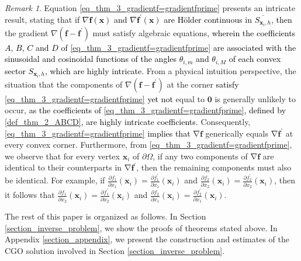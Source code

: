 \documentclass[11pt,reqno,oneside]{amsart}
\theoremstyle{definition}
\theoremstyle{remark}
\newtheorem{remark}{Remark}[section]
\numberwithin{equation}{section}
\numberwithin{equation}{section}
\theoremstyle{remark}
\DeclareMathOperator{\grad}{\nabla}
\begin{document}
\begin{remark}
	Equation \eqref{eq_thm_3_gradientf=gradientfprime} presents an intricate result, stating that \textcolor{black}{if $\nabla \mathbf{f}\left(\mathbf{x}\right)$ and $\nabla \mathbf{f}^{\prime}\left(\mathbf{x}\right)$ are H\"older continuous in $\overline{S_{\mathbf x_{i},h}}$, then} the gradient  $ \nabla \left(\mathbf{f}-\mathbf{f}^{\prime}\right) $ must satisfy algebraic equations, \textcolor{black}{wherein the coefficients $A$, $B$, $C$ and $D$ of  \eqref{eq_thm_3_gradientf=gradientfprime}  are associated with the sinusoidal and cosinoidal functions of the angles $\theta_{i,m}$ and $\theta_{i,M}$ of each convex sector $  S_{\mathbf{x}_{i},h}  $, which are  highly intricate.} From a physical intuition perspective, the situation that the components of $ \nabla \left(\mathbf{f}-\mathbf{f}^{\prime}\right) $ at the corner \textcolor{black}{satisfy \eqref{eq_thm_3_gradientf=gradientfprime} yet not} equal to $\mathbf{0}$ is generally unlikely to occur, \textcolor{black}{as the coefficients of \eqref{eq_thm_3_gradientf=gradientfprime}, defined  by \eqref{def_thm_2_ABCD}, are highly intricate coefficients.} Consequently, \textcolor{black}{\eqref{eq_thm_3_gradientf=gradientfprime} implies that} $ \grad\mathbf{f} $ generically  equals $ \grad\mathbf{f}^{\prime} $ at every convex corner. Furthermore, from \eqref{eq_thm_3_gradientf=gradientfprime}, we observe that for every vertex $ \mathbf{x}_{i} $ of $ \partial \Omega $, if any two components of  $ \grad\mathbf{f}$ are identical to their counterparts  in  $ \grad\mathbf{f}^{\prime}  $, then the remaining components must also be identical. For example, if $ \frac{\partial f_1}{\partial x_1}(\mathbf{x}_{i}) = \frac{\partial f^{\prime}_1}{\partial x_1}(\mathbf{x}_{i}) $ and $ \frac{\partial f_2}{\partial x_2}(\mathbf{x}_{i}) = \frac{\partial f^{\prime}_2}{\partial x_2}(\mathbf{x}_{i}) $, then it follows that $ \frac{\partial f_1}{\partial x_2}(\mathbf{x}_{i}) = \frac{\partial f^{\prime}_1}{\partial x_2}(\mathbf{x}_{i}) $ and $ \frac{\partial f_2}{\partial x_1}(\mathbf{x}_{i}) = \frac{\partial f^{\prime}_2}{\partial x_1}(\mathbf{x}_{i}) $.
\end{remark}





The rest of this paper is organized as follows. In Section \ref{section_inverse_problem}, we show the proofs of theorems stated above. In Appendix \ref{section_appendix}, we present the construction and estimates of the CGO solution involved in Section \ref{section_inverse_problem}. 
\end{document}
